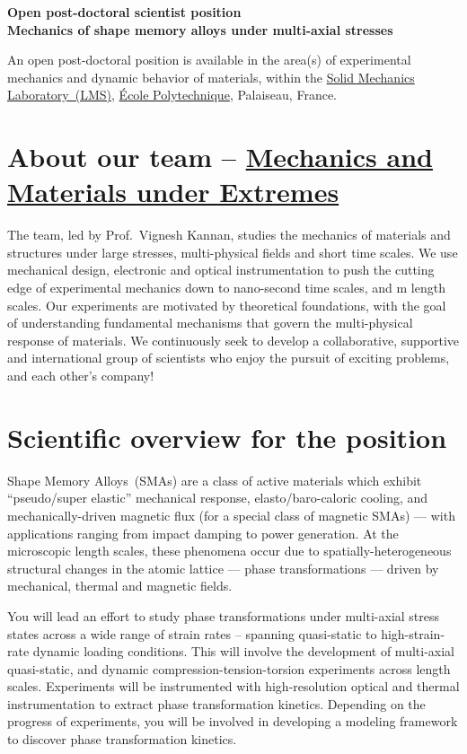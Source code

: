 \documentclass[a4paper,11pt,fleqn]{article}
\begin{document}
	\setlength{\abovedisplayskip}{2 pt}
	\setlength{\belowdisplayskip}{2 pt}
	\sffamily
	\thispagestyle{titlepage}
	\begin{center}
		\vspace*{-2.5em}
		\Large \textbf{Open post-doctoral scientist position \\ Mechanics of shape memory alloys under multi-axial stresses} 
	\end{center}
	
	An open post-doctoral position is available in the area(s) of experimental mechanics and dynamic behavior of materials, within the \href{https://portail.polytechnique.edu/lms/en}{Solid Mechanics Laboratory~(LMS)}, \href{https://www.polytechnique.edu/en}{{\'E}cole Polytechnique}, Palaiseau, France. 
	
	\section*{About our team -- \href{https://www.vignesh-kannan.com/}{Mechanics and Materials under Extremes}}
	The team, led by Prof.~Vignesh Kannan, studies the mechanics of materials and structures under large stresses, multi-physical fields and short time scales. We use mechanical design, electronic and optical instrumentation to push the cutting edge of experimental mechanics down to nano-second time scales, and \textmu m length scales. Our experiments are motivated by theoretical foundations, with the goal of understanding fundamental mechanisms that govern the multi-physical response of materials. We continuously seek to develop a collaborative, supportive and international group of scientists who enjoy the pursuit of exciting problems, and each other's company!

	\section*{Scientific overview for the position}
	Shape Memory Alloys~(SMAs) are a class of active materials which exhibit ``pseudo/super elastic'' mechanical response, elasto/baro-caloric cooling, and mechanically-driven magnetic flux (for a special class of magnetic SMAs) --- with applications ranging from impact damping to power generation. At the microscopic length scales, these phenomena occur due to spatially-heterogeneous structural changes in the atomic lattice --- phase transformations --- driven by mechanical, thermal and magnetic fields. 
	
	You will lead an effort to study phase transformations under multi-axial stress states across a wide range of strain rates -- spanning quasi-static to high-strain-rate dynamic loading conditions. This will involve the development of multi-axial quasi-static, and dynamic compression-tension-torsion experiments across length scales. Experiments will be instrumented with high-resolution optical and thermal instrumentation to extract phase transformation kinetics. Depending on the progress of experiments, you will be involved in developing a modeling framework to discover phase transformation kinetics. 
	
\end{document}
